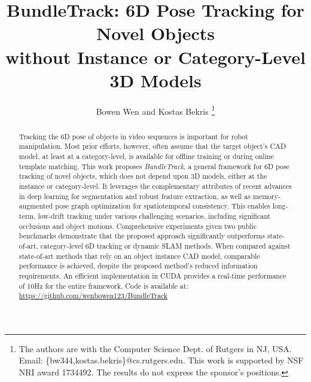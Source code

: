\documentclass[letterpaper, 10 pt, conference]{ieeeconf}
\title{\LARGE \bf BundleTrack: 6D Pose Tracking for Novel Objects\\ without Instance or Category-Level 3D Models
}
\author{Bowen Wen and Kostas Bekris \thanks{The authors are with the Computer Science Dept. of Rutgers in NJ, USA. Email: \{bw344,kostas.bekris\}@cs.rutgers.edu. This work is supported by NSF NRI award 1734492. The results do not express the sponsor's positions.}}
\begin{document}


\maketitle
\thispagestyle{empty}
\pagestyle{empty}


\begin{abstract}
Tracking the 6D pose of objects in video sequences is important for  robot manipulation. Most prior efforts, however, often assume that the target object's CAD model, at least at a category-level, is available for offline training or during online template matching. This work proposes \textit{BundleTrack}, a general framework for 6D pose tracking of novel objects, which does not depend upon 3D models, either at the instance or category-level. It leverages the complementary attributes of recent advances in deep learning for segmentation and robust feature extraction, as well as memory-augmented pose graph optimization for spatiotemporal consistency. This enables long-term, low-drift tracking under various challenging scenarios, including significant occlusions and object motions.  Comprehensive experiments given two public benchmarks demonstrate that the proposed approach significantly outperforms state-of-art, category-level 6D tracking or dynamic SLAM methods. When compared against state-of-art methods that rely on an object instance CAD model, comparable performance is achieved, despite the proposed method's reduced information requirements. An efficient implementation in CUDA provides a real-time performance of 10Hz for the entire framework. Code is available at: \url{https://github.com/wenbowen123/BundleTrack}
 \end{abstract}
\end{document}
